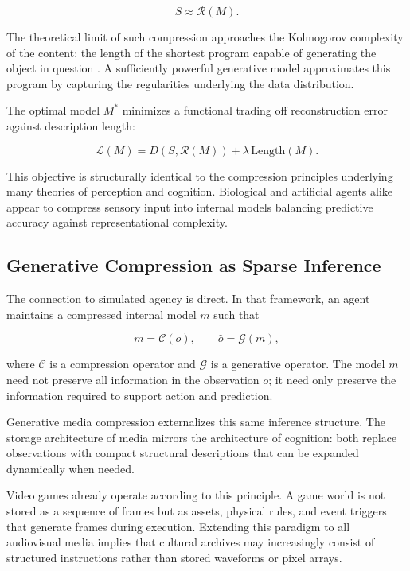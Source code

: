 \documentclass[12pt,a4paper]{article}
\theoremstyle{plain}
\theoremstyle{definition}
\begin{document}
\begin{equation}
S \approx \mathcal{R}(M).
\end{equation}

The theoretical limit of such compression approaches the Kolmogorov complexity of the content: the length of the shortest program capable of generating the object in question \cite{Kolmogorov1965,Solomonoff1964}. A sufficiently powerful generative model approximates this program by capturing the regularities underlying the data distribution.

The optimal model $M^*$ minimizes a functional trading off reconstruction error against description length:

\begin{equation}
\mathcal{L}(M) = D(S, \mathcal{R}(M)) + \lambda\,\text{Length}(M).
\end{equation}

This objective is structurally identical to the compression principles underlying many theories of perception and cognition. Biological and artificial agents alike appear to compress sensory input into internal models balancing predictive accuracy against representational complexity.

\subsection{Generative Compression as Sparse Inference}

The connection to simulated agency is direct. In that framework, an agent maintains a compressed internal model $m$ such that

\begin{equation}
m = \mathcal{C}(o), \qquad \hat{o} = \mathcal{G}(m),
\end{equation}

where $\mathcal{C}$ is a compression operator and $\mathcal{G}$ is a generative operator. The model $m$ need not preserve all information in the observation $o$; it need only preserve the information required to support action and prediction.

Generative media compression externalizes this same inference structure. The storage architecture of media mirrors the architecture of cognition: both replace observations with compact structural descriptions that can be expanded dynamically when needed.

Video games already operate according to this principle. A game world is not stored as a sequence of frames but as assets, physical rules, and event triggers that generate frames during execution. Extending this paradigm to all audiovisual media implies that cultural archives may increasingly consist of structured instructions rather than stored waveforms or pixel arrays.
\end{document}
